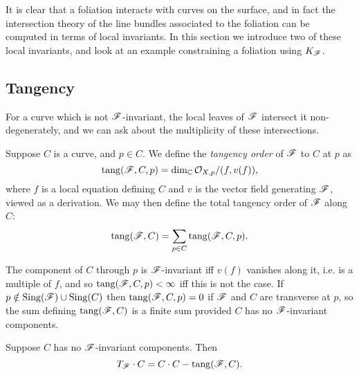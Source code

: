 
It is clear that a foliation interacts with curves on the surface, and in fact
the intersection theory of the line bundles associated to the foliation can be
computed in terms of local invariants. In this section we introduce two of these
local invariants, and look at an example constraining a foliation using
$K_{\mathscr{F}}$.

\subsection{Tangency}

For a curve which is not $\mathscr{F}$-invariant, the local leaves of $\mathscr{F}$
intersect it non-degenerately, and we can ask about the multiplicity of these
intersections.

\begin{definition}
    Suppose $C$ is a curve, and $p\in C$. We define the \emph{tangency order} of
    $\mathscr{F}$ to $C$ at $p$ as
    \begin{equation*}
        \operatorname{tang}(\mathscr{F},C,p) = \dim_{\mathbb{C}}\mathcal{O}_{X,p}/(f,v(f)),
    \end{equation*}
    where $f$ is a local equation defining $C$ and $v$ is the vector field
    generating $\mathscr{F}$, viewed as a derivation. We may then define the total
    tangency order of $\mathscr{F}$ along $C$:
    \begin{equation*}
        \operatorname{tang}(\mathscr{F},C) = \sum_{p\in C}\operatorname{tang}(\mathscr{F},C,p).
    \end{equation*}
\end{definition}

\begin{remark}
    The component of $C$ through $p$ is $\mathscr{F}$-invariant iff $v(f)$ vanishes
    along it, i.e. is a multiple of $f$, and so $\operatorname{tang}(\mathscr{F},C,p)<\infty$ iff
    this is not the case. If $p\notin\operatorname{Sing}(\mathscr{F})\cup\operatorname{Sing}(C)$ then
    $\operatorname{tang}(\mathscr{F},C,p)=0$ if $\mathscr{F}$ and $C$ are transverse at $p$, so the sum
    defining $\operatorname{tang}(\mathscr{F},C)$ is a finite sum provided $C$ has no
    $\mathscr{F}$-invariant components.
\end{remark}

\begin{proposition}\label{prop:tangency}
    Suppose $C$ has no $\mathscr{F}$-invariant components. Then
    \begin{equation*}
        T_{\mathscr{F}}\cdot C = C\cdot C - \operatorname{tang}(\mathscr{F},C).
    \end{equation*}
\end{proposition}

